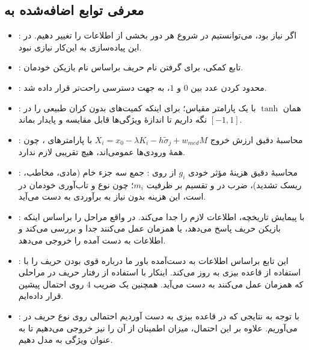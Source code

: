 \documentclass[12pt]{article}
\begin{document}
\subsection{معرفی توابع اضافه‌شده به }
\begin{itemize}
    \item {}:
    اگر نیاز بود، می‌توانستیم در شروع هر دور بخشی از اطلاعات
    را تغییر دهیم. در این پیاده‌سازی به این‌کار نیازی نبود.

    \item {}:
    تابع کمکی، برای گرفتن نام حریف براساس نام بازیکن خودمان.

    \item {}:
    محدود کردن عدد بین $0$ و $1$، به جهت دسترسی راحت‌تر قرار داده شد.

    \item {}:
    همان $\tanh$
     با یک پارامتر مقیاس؛ برای اینکه کمیت‌های بدون کران طبیعی
     را در $[-1,1]$ نگه داریم تا اندازهٔ ویژگی‌ها قابل مقایسه و پایدار بماند.

    \item {}:
    محاسبهٔ دقیق ارزش خروج $X_i = x_0 - \lambda K_i - h \tilde{\sigma}_j + w_{med} M$
    با پارامترهای ،
     چون همهٔ ورودی‌ها عمومی‌اند، هیچ تقریبی
     لازم ندارد.

    \item {}:
    محاسبهٔ دقیق هزینهٔ مؤثر خودی $g_i$
     از روی :
      جمع سه جزء خام
    (مادی، مخاطب، ریسک تشدید)، ضرب در 
     و تقسیم بر ظرفیت $m_i$؛
    چون نوع و تاب‌آوری خودمان در  است، این هزینه‌ بدون نیاز به برآوردی به دست می‌آید.

    \item {}:
    با پیمایش تاریخچه، اطلاعات لازم را جدا می‌کند. در واقع مراحل را براساس اینکه بازیکن حریف
    پاسخ می‌دهد، یا همزمان عمل می‌کنند جدا و بررسی می‌کند و اطلاعات به دست ‌آمده را خروجی 
    می‌دهد.

    \item {}:
    این تابع براساس اطلاعات به دست‌آمده باور ما درباره قوی بودن حریف را با استفاده
    از قاعده بیزی به روز می‌کند. اینکار با استفاده از رفتار حریف در مراحلی که همزمان
    عمل می‌کنند به دست می‌آید. همچنین یک ضریب $4$
    روی احتمال پیشین قرار داده‌ایم.


    \item {}:
    با توجه به نتایجی که در قاعده بیزی به دست آوردیم احتمالی روی نوع حریف در می‌آوریم.
    علاوه بر این احتمال، میزان اطمینان از آن را نیز خروجی می‌دهیم تا به عنوان ویژگی به مدل دهیم.


\end{itemize}
\end{document}
